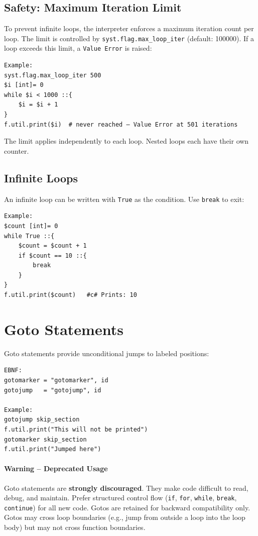 \subsection{Safety: Maximum Iteration Limit}
To prevent infinite loops, the interpreter enforces a maximum iteration count per loop. The limit is controlled by \texttt{syst.flag.max\_loop\_iter} (default: 100000). If a loop exceeds this limit, a \texttt{Value Error} is raised:
\begin{verbatim}
Example:
syst.flag.max_loop_iter 500
$i [int]= 0
while $i < 1000 ::{
    $i = $i + 1
}
f.util.print($i)  # never reached — Value Error at 501 iterations
\end{verbatim}
The limit applies independently to each loop. Nested loops each have their own counter.

\subsection{Infinite Loops}
An infinite loop can be written with \texttt{True} as the condition. Use \texttt{break} to exit:
\begin{verbatim}
Example:
$count [int]= 0
while True ::{
    $count = $count + 1
    if $count == 10 ::{
        break
    }
}
f.util.print($count)   #c# Prints: 10
\end{verbatim}

\section{Goto Statements}
Goto statements provide unconditional jumps to labeled positions:
\begin{verbatim}
EBNF:
gotomarker = "gotomarker", id
gotojump   = "gotojump", id

Example:
gotojump skip_section
f.util.print("This will not be printed")
gotomarker skip_section
f.util.print("Jumped here")
\end{verbatim}

\paragraph{Warning -- Deprecated Usage}
Goto statements are \textbf{strongly discouraged}. They make code difficult to read, debug, and maintain. Prefer structured control flow (\texttt{if}, \texttt{for}, \texttt{while}, \texttt{break}, \texttt{continue}) for all new code. Gotos are retained for backward compatibility only. Gotos may cross loop boundaries (e.g., jump from outside a loop into the loop body) but may not cross function boundaries.

